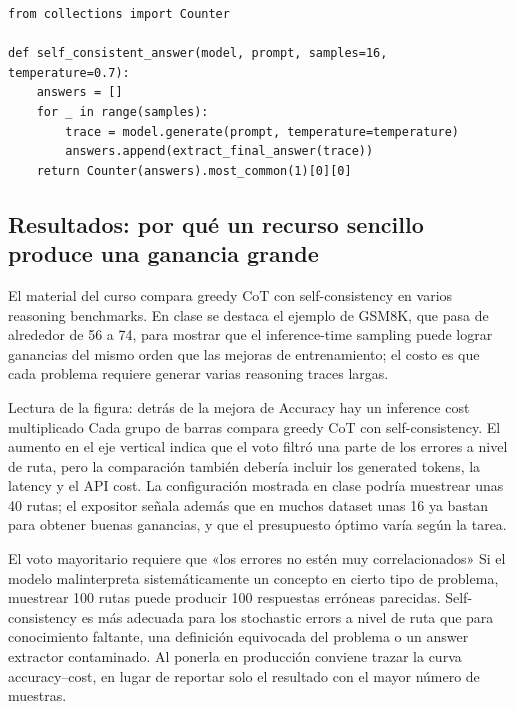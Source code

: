 \begin{lstlisting}[caption={Marco mínimo de implementación de Self-consistency}]
from collections import Counter

def self_consistent_answer(model, prompt, samples=16, temperature=0.7):
    answers = []
    for _ in range(samples):
        trace = model.generate(prompt, temperature=temperature)
        answers.append(extract_final_answer(trace))
    return Counter(answers).most_common(1)[0][0]
\end{lstlisting}

\subsection{Resultados: por qué un recurso sencillo produce una ganancia grande}

El material del curso compara greedy CoT con self-consistency en varios reasoning benchmarks. En clase se destaca el ejemplo de GSM8K, que pasa de alrededor de 56 a 74, para mostrar que el inference-time sampling puede lograr ganancias del mismo orden que las mejoras de entrenamiento; el costo es que cada problema requiere generar varias reasoning traces largas.


\begin{knowledgebox}{Lectura de la figura: detrás de la mejora de Accuracy hay un inference cost multiplicado}
Cada grupo de barras compara greedy CoT con self-consistency. El aumento en el eje vertical indica que el voto filtró una parte de los errores a nivel de ruta, pero la comparación también debería incluir los generated tokens, la latency y el API cost. La configuración mostrada en clase podría muestrear unas 40 rutas; el expositor señala además que en muchos dataset unas 16 ya bastan para obtener buenas ganancias, y que el presupuesto óptimo varía según la tarea.
\end{knowledgebox}

\begin{warningbox}{El voto mayoritario requiere que «los errores no estén muy correlacionados»}
Si el modelo malinterpreta sistemáticamente un concepto en cierto tipo de problema, muestrear 100 rutas puede producir 100 respuestas erróneas parecidas. Self-consistency es más adecuada para los stochastic errors a nivel de ruta que para conocimiento faltante, una definición equivocada del problema o un answer extractor contaminado. Al ponerla en producción conviene trazar la curva accuracy--cost, en lugar de reportar solo el resultado con el mayor número de muestras.
\end{warningbox}

